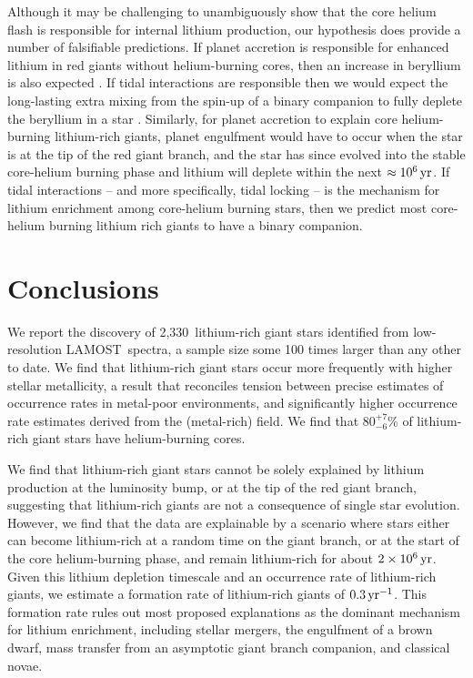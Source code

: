 \documentclass[twocolumn]{aastex62}
\newcommand{\SampleSize}{2,330}
\newcommand\lamost{LAMOST}
\begin{document}
Although it may be challenging to unambiguously show that the core helium flash is
responsible for internal lithium production, our hypothesis does provide a number of
falsifiable predictions. 
If planet accretion is responsible for enhanced lithium in red giants without 
helium-burning cores, then an increase in beryllium is also expected \citep{Siess_1999,
Melo_2005}. If tidal interactions are responsible then we would expect the 
long-lasting extra mixing from the spin-up of a binary companion to fully deplete
the beryllium in a star \citep{Sackmann_1999}.
Similarly, for planet accretion to explain core helium-burning lithium-rich giants,
planet engulfment would have to occur when the star is at the tip of the red giant
branch, and the star has since evolved into the stable core-helium burning phase and
lithium will deplete within the next $\approx10^{6}\,{\rm yr}$. If tidal interactions -- and more specifically, tidal locking -- is the mechanism for lithium enrichment among core-helium burning stars, then we predict most core-helium burning lithium rich giants to have a binary companion.


\section{Conclusions} \label{sec:conclusions}

We report the discovery of \SampleSize\ lithium-rich giant stars identified
from low-resolution \lamost\ spectra, a sample size some 100 times larger than any other to date.
We find that lithium-rich giant stars occur more frequently with higher stellar 
metallicity, a result that reconciles tension between precise estimates of occurrence
rates in metal-poor environments, and significantly higher occurrence rate estimates
derived from the (metal-rich) field. We find that $80^{+7}_{-6}$\% of lithium-rich 
giant stars have helium-burning cores.

We find that lithium-rich giant stars cannot be solely explained by lithium production
at the luminosity bump, or at the tip of the red giant branch, suggesting that 
lithium-rich giants are not a consequence of single star evolution. However, we find
that the data are explainable by a scenario where stars either can become lithium-rich 
at a random time on the giant branch, or at the start of the core helium-burning
phase, and remain lithium-rich for about $2\times10^{6}\,{\rm yr}$. 
Given this lithium depletion timescale and an occurrence rate of lithium-rich giants, 
we estimate a formation rate of lithium-rich giants of $0.3\,{\rm yr}^{-1}$. This
formation rate rules out most proposed explanations as the dominant mechanism for lithium enrichment, including
stellar mergers, the engulfment of a brown dwarf, mass transfer from an asymptotic 
giant branch companion, and classical novae.
\end{document}
